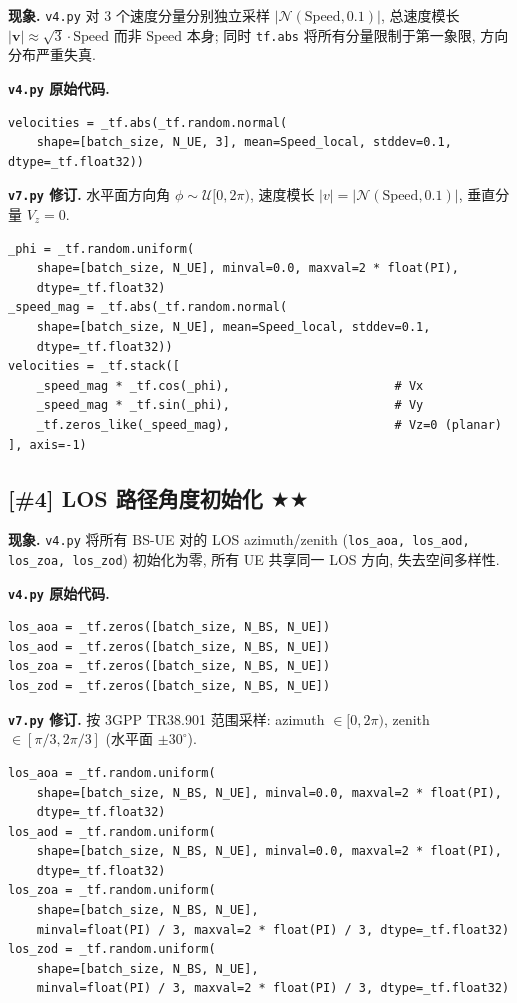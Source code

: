 \documentclass[11pt,a4paper,UTF8,fontset=fandol]{ctexart}
\newcommand{\stwo}{\textcolor{starcolor}{$\bigstar\bigstar$}}
\newcommand{\vfour}{\texttt{v4.py}}
\newcommand{\vseven}{\texttt{v7.py}}
\newcommand{\bugitem}[3]{%
  \subsection{[\##1] #2 \hfill #3}%
  \vspace{-0.5em}%
}
\begin{document}
\textbf{现象.} \vfour{} 对 3 个速度分量分别独立采样
$|\mathcal{N}(\text{Speed}, 0.1)|$, 总速度模长
$|\boldsymbol{v}| \approx \sqrt{3}\cdot\text{Speed}$ 而非
$\text{Speed}$ 本身; 同时 \texttt{tf.abs} 将所有分量限制于第一象限,
方向分布严重失真.

\textbf{\vfour{} 原始代码.}
\begin{lstlisting}[caption={v4.py: lines 1774--1775}]
velocities = _tf.abs(_tf.random.normal(
    shape=[batch_size, N_UE, 3], mean=Speed_local, stddev=0.1, dtype=_tf.float32))
\end{lstlisting}

\textbf{\vseven{} 修订.} 水平面方向角 $\phi \sim \mathcal{U}[0, 2\pi)$,
速度模长 $|v| = |\mathcal{N}(\text{Speed}, 0.1)|$, 垂直分量 $V_z = 0$.
\begin{lstlisting}[caption={v7.py: lines 2011--2023}]
_phi = _tf.random.uniform(
    shape=[batch_size, N_UE], minval=0.0, maxval=2 * float(PI),
    dtype=_tf.float32)
_speed_mag = _tf.abs(_tf.random.normal(
    shape=[batch_size, N_UE], mean=Speed_local, stddev=0.1,
    dtype=_tf.float32))
velocities = _tf.stack([
    _speed_mag * _tf.cos(_phi),                       # Vx
    _speed_mag * _tf.sin(_phi),                       # Vy
    _tf.zeros_like(_speed_mag),                       # Vz=0 (planar)
], axis=-1)
\end{lstlisting}

\bugitem{4}{LOS 路径角度初始化}{\stwo}

\textbf{现象.} \vfour{} 将所有 BS-UE 对的 LOS azimuth/zenith
(\texttt{los\_aoa, los\_aod, los\_zoa, los\_zod}) 初始化为零,
所有 UE 共享同一 LOS 方向, 失去空间多样性.

\textbf{\vfour{} 原始代码.}
\begin{lstlisting}[caption={v4.py: lines 1776--1779}]
los_aoa = _tf.zeros([batch_size, N_BS, N_UE])
los_aod = _tf.zeros([batch_size, N_BS, N_UE])
los_zoa = _tf.zeros([batch_size, N_BS, N_UE])
los_zod = _tf.zeros([batch_size, N_BS, N_UE])
\end{lstlisting}

\textbf{\vseven{} 修订.} 按 3GPP TR38.901 范围采样:
azimuth $\in [0, 2\pi)$, zenith $\in [\pi/3, 2\pi/3]$ (水平面 $\pm 30^{\circ}$).
\begin{lstlisting}[caption={v7.py: lines 2030--2041}]
los_aoa = _tf.random.uniform(
    shape=[batch_size, N_BS, N_UE], minval=0.0, maxval=2 * float(PI),
    dtype=_tf.float32)
los_aod = _tf.random.uniform(
    shape=[batch_size, N_BS, N_UE], minval=0.0, maxval=2 * float(PI),
    dtype=_tf.float32)
los_zoa = _tf.random.uniform(
    shape=[batch_size, N_BS, N_UE],
    minval=float(PI) / 3, maxval=2 * float(PI) / 3, dtype=_tf.float32)
los_zod = _tf.random.uniform(
    shape=[batch_size, N_BS, N_UE],
    minval=float(PI) / 3, maxval=2 * float(PI) / 3, dtype=_tf.float32)
\end{lstlisting}
\end{document}
